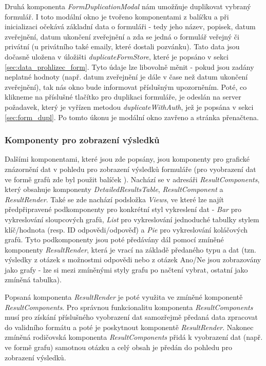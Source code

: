 			Druhá komponenta \textit{FormDuplicationModal} nám umožňuje duplikovat vybraný formulář. I toto modální okno je tvořeno komponentami z balíčku  a při inicializaci očekává základní data o formuláři - tedy jeho název, popisek, datum zveřejnění, datum ukončení zveřejnění a zda se jedná o formulář veřejný či privátní (u privátního také emaily, které dostali pozvánku). Tato data jsou dočasně uložena v úložišti \textit{duplicateFormStore}, které je popsáno v sekci \ref{sec:data_prohlizec_form}. Tyto údaje lze libovolně měnit - pokud jsou zadány neplatné hodnoty (např. datum zveřejnění je dále v čase než datum ukončení zveřejnění), tak nás okno bude informovat příslušným upozorněním. Poté, co klikneme na příslušné tlačítko pro duplikaci formuláře, je odeslán na server požadavek, který je vyřízen metodou \textit{duplicateWithAuth}, jež je popsána v sekci \ref{sec:form_dupl}. Po tomto úkonu je modální okno zavřeno a stránka přenačtena.
		
		\subsubsection{Komponenty pro zobrazení výsledků} %
		Dalšími komponentami, které jsou zde popsány, jsou komponenty pro grafické znázornění dat v pohledu pro zobrazení výsledků formuláře (pro vyobrazení dat ve formě grafů zde byl použit balíček ). Nachází se v adresáři \textit{ResultComponents}, který obsahuje komponenty \textit{DetailedResultsTable}, \textit{ResultComponent} a \textit{ResultRender}. Také se zde nachází podsložka \textit{Views}, ve které lze najít předpřipravené podkomponenty pro konkrétní styl vykreslení dat - \textit{Bar} pro vykreslování sloupcových grafů, \textit{List} pro vykreslování jednoduché tabulky stylem klíč/hodnota (resp. ID odpovědi/odpověď) a \textit{Pie} pro vykreslování koláčových grafů. Tyto podkomponenty jsou poté předávány dál pomocí zmíněné komponenty \textit{ResultRender}, která je vrací na základě předaného typu a dat (tzn. výsledky z otázek s možnostmi odpovědi nebo z otázek Ano/Ne jsou zobrazovány jako grafy - lze si mezi zmíněnými styly grafu po načtení vybrat, ostatní jako zmíněná tabulka).
		
		Popsaná komponenta \textit{ResultRender} je poté využita ve zmíněné komponentě \textit{ResultComponents}. Pro správnou funkcionalitu komponenta \textit{ResultComponents} musí pro získání příslušného vyobrazení dat samozřejmě předaná data zpracovat do validního formátu a poté je poskytnout komponentě \textit{ResultRender}. Nakonec zmíněná rodičovská komponenta \textit{ResultComponents} přidá k vyobrazení dat (např. ve formě grafu) samotnou otázku a celý obsah je předán do pohledu pro zobrazení výsledků.
		
